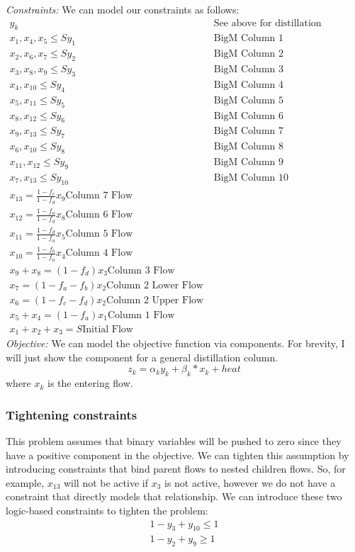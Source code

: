 \documentclass[11pt]{article}
\begin{document}
\textit{Constraints:}
We can model our constraints as follows:
\begin{align*}
  y_k & \quad  \text{See above for distillation constraints} \\
  x_1,x_4, x_5 \leq S y_1 & \quad \text{BigM Column 1} \\ 
  x_2, x_6, x_7 \leq S y_2 & \quad \text{BigM Column 2} \\ 
  x_3, x_8, x_9 \leq S y_3 & \quad \text{BigM Column 3} \\ 
  x_4, x_{10} \leq S y_4 & \quad \text{BigM Column 4} \\ 
  x_5, x_{11} \leq S y_5 & \quad \text{BigM Column 5} \\ 
  x_8, x_{12} \leq S y_6 & \quad \text{BigM Column 6} \\ 
  x_9, x_{13} \leq S y_7 & \quad \text{BigM Column 7} \\ 
  x_6, x_{10} \leq S y_8 & \quad \text{BigM Column 8} \\ 
  x_{11}, x_{12} \leq S y_9 & \quad \text{BigM Column 9} \\ 
  x_{7}, x_{13} \leq S y_{10} & \quad \text{BigM Column 10} \\ 
  x_{13} = \frac{1-f_c}{1-f_d}x_{9} \text{Column 7 Flow} \\
  x_{12} = \frac{1-f_a}{1-f_d} x_{8} \text{Column 6 Flow} \\
  x_{11} = \frac{1-f_d}{1-f_a} x_5 \text{Column 5 Flow} \\
  x_{10} = \frac{1-f_b}{1-f_a} x_4 \text{Column 4 Flow}\\ 
  x_9 + x_8 = (1-f_d) x_3 \text{Column 3 Flow} \\
  x_7 = (1-f_a-f_b) x_2 \text{Column 2 Lower Flow} \\
  x_6 = (1-f_c-f_d) x_2 \text{Column 2 Upper Flow} \\
  x_5 + x_4 = (1-f_a) x_1 \text{Column 1 Flow} \\
  x_1 + x_2 + x_3 = S \text{Initial Flow}
\end{align*}
\textit{Objective:}
We can model the objective function via components.
For brevity, I will just show the component for a general distillation column.
\begin{equation*}
  z_k = \alpha_k y_k + \beta_k * x_k+ heat
\end{equation*}
where $x_k$ is the entering flow.
\subsubsection{Tightening constraints}
This problem assumes that binary variables will be pushed to zero since they have a positive component in the objective.
We can tighten this assumption by introducing constraints that bind parent flows to nested children flows.
So, for example, $x_13$ will not be active if $x_3$ is not active, however we do not have a constraint that directly models that relationship.
We can introduce these two logic-based constraints to tighten the problem:
\begin{align*}
  1-y_3 + y_{10} \leq 1 \\
  1-y_2 + y_{9} \geq 1
\end{align*}
\end{document}
